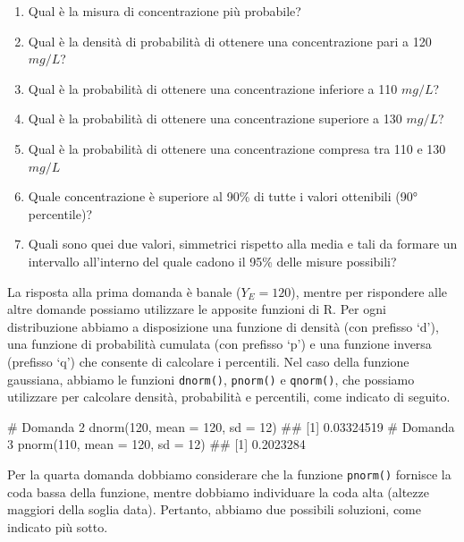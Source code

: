 \documentclass[a4paper,12pt,oneside]{book}
\providecommand{\tightlist}{%
  \setlength{\itemsep}{0pt}\setlength{\parskip}{0pt}}
\newenvironment{Shaded}{\begin{snugshade}}{\end{snugshade}}
\newcommand{\DecValTok}[1]{#1}
\newcommand{\CommentTok}[1]{#1}
\newcommand{\DocumentationTok}[1]{#1}
\newcommand{\FunctionTok}[1]{#1}
\newcommand{\AttributeTok}[1]{#1}
\newcommand{\NormalTok}[1]{#1}
\begin{document}
\begin{enumerate}
\def\labelenumi{\arabic{enumi}.}
\tightlist
\item
  Qual è la misura di concentrazione più probabile?
\item
  Qual è la densità di probabilità di ottenere una concentrazione pari a 120 \(mg/L\)?
\item
  Qual è la probabilità di ottenere una concentrazione inferiore a 110 \(mg/L\)?
\item
  Qual è la probabilità di ottenere una concentrazione superiore a 130 \(mg/L\)?
\item
  Qual è la probabilità di ottenere una concentrazione compresa tra 110 e 130 \(mg/L\)
\item
  Quale concentrazione è superiore al 90\% di tutte i valori ottenibili (90° percentile)?
\item
  Quali sono quei due valori, simmetrici rispetto alla media e tali da formare un intervallo all'interno del quale cadono il 95\% delle misure possibili?
\end{enumerate}

La risposta alla prima domanda è banale (\(Y_E = 120\)), mentre per rispondere alle altre domande possiamo utilizzare le apposite funzioni di R. Per ogni distribuzione abbiamo a disposizione una funzione di densità (con prefisso `d'), una funzione di probabilità cumulata (con prefisso `p') e una funzione inversa (prefisso `q') che consente di calcolare i percentili. Nel caso della funzione gaussiana, abbiamo le funzioni \texttt{dnorm()}, \texttt{pnorm()} e \texttt{qnorm()}, che possiamo utilizzare per calcolare densità, probabilità e percentili, come indicato di seguito.

\begin{Shaded}
\begin{Highlighting}[]
\CommentTok{\# Domanda 2}
\FunctionTok{dnorm}\NormalTok{(}\DecValTok{120}\NormalTok{, }\AttributeTok{mean =} \DecValTok{120}\NormalTok{, }\AttributeTok{sd =} \DecValTok{12}\NormalTok{)}
\DocumentationTok{\#\# [1] 0.03324519}
\CommentTok{\# Domanda 3}
\FunctionTok{pnorm}\NormalTok{(}\DecValTok{110}\NormalTok{, }\AttributeTok{mean =} \DecValTok{120}\NormalTok{, }\AttributeTok{sd =} \DecValTok{12}\NormalTok{)}
\DocumentationTok{\#\# [1] 0.2023284}
\end{Highlighting}
\end{Shaded}

Per la quarta domanda dobbiamo considerare che la funzione \texttt{pnorm()} fornisce la coda bassa della funzione, mentre dobbiamo individuare la coda alta (altezze maggiori della soglia data). Pertanto, abbiamo due possibili soluzioni, come indicato più sotto.
\end{document}
